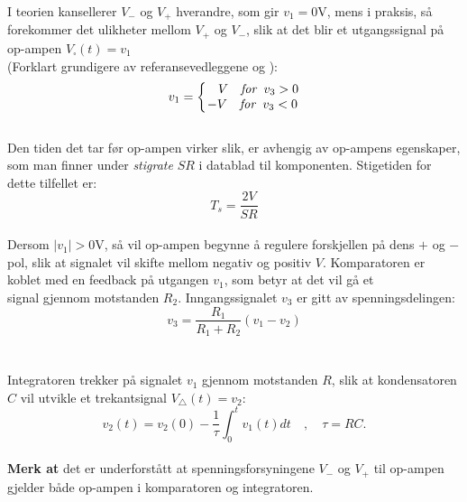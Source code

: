 \documentclass[a4paper,11pt,norsk]{article}
\begin{document}
I teorien kansellerer $V_-$ og $V_+$ hverandre, som gir $v_1 = 0$V, mens i praksis, så forekommer det ulikheter mellom $V_+$ og $V_-$, slik at det blir et utgangssignal på op-ampen $V_\square (t) = v_1$ \\(Forklart grundigere av referansevedleggene \cite{komparator} og \cite{komparator_vid}):
\\
\begin{equation}
 v_1 = 
\left\{\begin{matrix}
    \textit{ \: } V \quad \textit{for \:} v_3 > 0 \\
    -V \quad \textit{for \:} v_3 < 0
\end{matrix}\right .
\label{eq:square}
\end{equation}
\\
Den tiden det tar før op-ampen virker slik, er avhengig av op-ampens egenskaper, som man finner under \emph{stigrate} $SR$ i datablad til komponenten. Stigetiden for dette tilfellet er:
\\
\begin{equation}
    T_s = \frac{2V}{SR}
    \label{eq:T_s}
\end{equation}
\\
Dersom $|v_1| > 0$V, så vil op-ampen begynne å regulere forskjellen på dens $+$ og $-$ pol, slik at signalet vil skifte mellom negativ og positiv $V$. 
\newpage
Komparatoren er koblet med en feedback på utgangen $v_1$, som betyr at det vil gå et \\ signal gjennom motstanden $R_2$. Inngangssignalet $v_3$ er gitt av spenningsdelingen: \\
\begin{equation}
    v_3 = \frac{R_1}{R_1+R_2}(v_1 - v_2)
    \label{eq:spenningsdeling}
\end{equation}
\\\\
Integratoren trekker på signalet $v_1$ gjennom motstanden $R$, slik at kondensatoren $C$ vil utvikle et trekantsignal $V_\triangle (t) = v_2$:
\\
\begin{equation}
    v_2(t) = v_2 (0) - \frac{1}{\tau} \int^t _0 v_1 (t) dt
    \quad , \quad \tau = RC\textit{.}
\label{eq:integral}
\end{equation}
\\
\textbf{Merk at } det er underforstått at spenningsforsyningene $V_-$ og $V_+$ til op-ampen gjelder både op-ampen i komparatoren og integratoren.
\\\\
\end{document}
